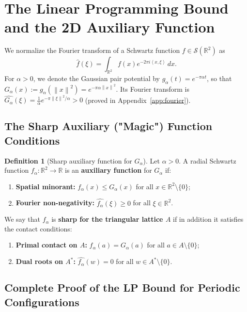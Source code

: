 \documentclass[11pt, a4paper]{article}
\theoremstyle{definition}
\newtheorem{definition}[theorem]{Definition}
\theoremstyle{remark}
\newcommand{\R}{\mathbb{R}}
\newcommand{\Scal}{\mathcal{S}}
\newcommand{\norm}[1]{\left\lVert #1 \right\rVert}
\newcommand{\inner}[2]{\left\langle #1, #2 \right\rangle}
\begin{document}
\section{The Linear Programming Bound and the 2D Auxiliary Function}
\label{sec:lp}

We normalize the Fourier transform of a Schwartz function $f \in \Scal(\R^2)$ as
\[
\widehat{f}(\xi) = \int_{\R^2} f(x) e^{-2\pi i \inner{x}{\xi}} \, dx.
\]
For $\alpha > 0$, we denote the Gaussian pair potential by $g_\alpha(t) = e^{-\pi \alpha t}$, so that $G_\alpha(x) := g_\alpha(\norm{x}^2) = e^{-\pi \alpha \norm{x}^2}$. Its Fourier transform is $\widehat{G_\alpha}(\xi) = \frac{1}{\alpha} e^{-\pi \norm{\xi}^2 / \alpha} > 0$ (proved in Appendix~\ref{app:fourier}).

\subsection{The Sharp Auxiliary ("Magic") Function Conditions}

\begin{definition}[Sharp auxiliary function for $G_\alpha$]
\label{def:aux}
Let $\alpha > 0$. A radial Schwartz function $f_\alpha : \R^2 \to \R$ is an \textbf{auxiliary function} for $G_\alpha$ if:
\begin{enumerate}[label=(\roman*)]
    \item \textbf{Spatial minorant:} $f_\alpha(x) \le G_\alpha(x)$ for all $x \in \R^2 \setminus \{0\}$;
    \item \textbf{Fourier non-negativity:} $\widehat{f_\alpha}(\xi) \ge 0$ for all $\xi \in \R^2$.
\end{enumerate}
We say that $f_\alpha$ is \textbf{sharp for the triangular lattice $A$} if in addition it satisfies the contact conditions:
\begin{enumerate}[label=(\roman*), start=3]
    \item \textbf{Primal contact on $A$:} $f_\alpha(a) = G_\alpha(a)$ for all $a \in A \setminus \{0\}$;
    \item \textbf{Dual roots on $A^*$:} $\widehat{f_\alpha}(w) = 0$ for all $w \in A^* \setminus \{0\}$.
\end{enumerate}
\end{definition}

\subsection{Complete Proof of the LP Bound for Periodic Configurations}
\end{document}

